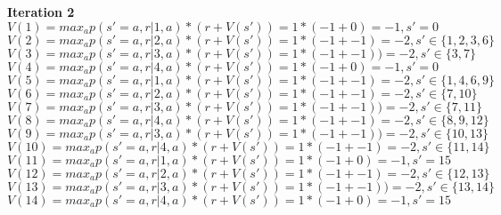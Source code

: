 \documentclass[11pt]{article}
\begin{document}
\begin{enumerate}
\begin{enumerate}
		\textbf{Iteration 2} \\
		$V(1) = max_a p(s'=a, r| 1, a) * (r + V(s')) = 1 * (-1 + 0) = -1, s'=0$ \\
		$V(2) = max_a p(s'=a, r| 2, a) * (r + V(s')) = 1 * (-1+-1) = -2, s' \in \{1,2,3,6\}$ \\
		$V(3) = max_a p(s'=a, r| 3, a) * (r + V(s')) = 1 * (-1+-1)) = -2, s' \in \{3,7\}$ \\
		$V(4) = max_a p(s'=a, r| 4, a) * (r + V(s')) = 1 * (-1 + 0) = -1, s' = 0$ \\
		$V(5) = max_a p(s'=a, r| 1, a) * (r + V(s')) = 1 * (-1 + -1) = -2, s' \in \{1,4,6,9\}$ \\
		$V(6) = max_a p(s'=a, r| 2, a) * (r + V(s')) = 1 * (-1+ -1) = -2, s' \in \{ 7, 10\}$ \\
		$V(7) = max_a p(s'=a, r| 3, a) * (r + V(s')) = 1 * (-1+ -1)) = -2, s' \in \{ 7, 11\}$ \\
		$V(8) = max_a p(s'=a, r| 4, a) * (r + V(s')) = 1 * (-1 + -1) = -2, s' \in \{ 8,9,12\}$ \\
		$V(9) = max_a p(s'=a, r| 3, a) * (r + V(s')) = 1 * (-1 + -1)) = -2, s' \in \{ 10,13\}$ \\
		$V(10) = max_a p(s'=a, r| 4, a) * (r + V(s')) = 1 * (-1 + -1) = -2, s' \in \{ 11,14\}$ \\
		$V(11) = max_a p(s'=a, r| 1, a) * (r + V(s')) = 1 * (-1 + 0) = -1, s' = 15$ \\
		$V(12) = max_a p(s'=a, r| 2, a) * (r + V(s')) = 1 * (-1+ -1) = -2, s' \in \{12,13\}$ \\
		$V(13) = max_a p(s'=a, r| 3, a) * (r + V(s')) = 1 * (-1+ -1)) = -2, s' \in \{13,14\}$ \\
		$V(14) = max_a p(s'=a, r| 4, a) * (r + V(s')) = 1 * (-1 + 0) = -1, s'=15$ \\
		

\end{enumerate}
\end{enumerate}
\end{document}
